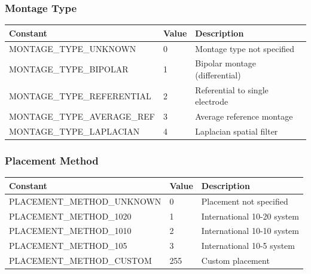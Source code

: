 \documentclass[11pt,a4paper]{article}
\begin{document}
\subsubsection{Montage Type}
\begin{longtable}{|>{\small}l|>{\small}l|>{\small}p{7cm}|}
\hline
\textbf{Constant} & \textbf{Value} & \textbf{Description} \\
\hline
MONTAGE\_TYPE\_UNKNOWN & 0 & Montage type not specified \\
MONTAGE\_TYPE\_BIPOLAR & 1 & Bipolar montage (differential) \\
MONTAGE\_TYPE\_REFERENTIAL & 2 & Referential to single electrode \\
MONTAGE\_TYPE\_AVERAGE\_REF & 3 & Average reference montage \\
MONTAGE\_TYPE\_LAPLACIAN & 4 & Laplacian spatial filter \\
\hline
\end{longtable}

\subsubsection{Placement Method}
\begin{longtable}{|>{\small}l|>{\small}l|>{\small}p{7cm}|}
\hline
\textbf{Constant} & \textbf{Value} & \textbf{Description} \\
\hline
PLACEMENT\_METHOD\_UNKNOWN & 0 & Placement not specified \\
PLACEMENT\_METHOD\_1020 & 1 & International 10-20 system \\
PLACEMENT\_METHOD\_1010 & 2 & International 10-10 system \\
PLACEMENT\_METHOD\_105 & 3 & International 10-5 system \\
PLACEMENT\_METHOD\_CUSTOM & 255 & Custom placement \\
\hline
\end{longtable}
\end{document}
